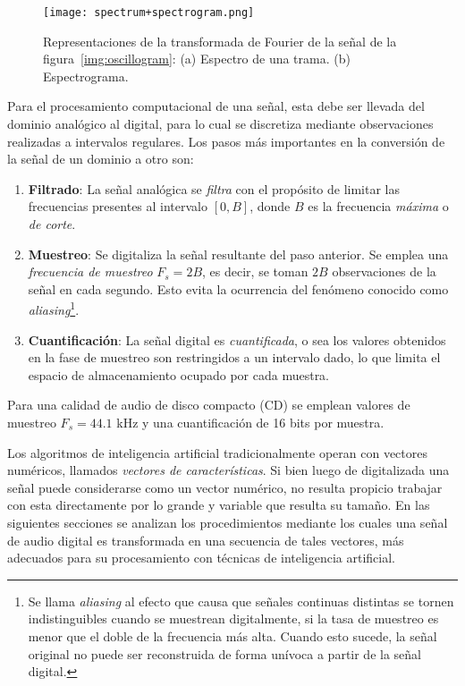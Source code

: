 \begin{figure}[!h]
    \centering
    \texttt{[image: spectrum+spectrogram.png]}
    \caption{Representaciones de la transformada de Fourier de la señal de la figura~\ref{img:oscillogram}: (a) Espectro de una trama. (b) Espectrograma.}
    \label{img:spectrum+spectrogram}
\end{figure}

Para el procesamiento computacional de una señal, esta debe ser llevada del dominio analógico al digital, para lo cual se discretiza mediante observaciones realizadas a intervalos regulares.
Los pasos más importantes en la conversión de la señal de un dominio a otro son:

\begin{enumerate}
    \item \textbf{Filtrado}: La señal analógica se \textit{filtra} con el propósito de limitar las frecuencias presentes al intervalo $[0,B]$, donde $B$ es la frecuencia \textit{máxima} o \textit{de corte}.
    \item \textbf{Muestreo}: Se digitaliza la señal resultante del paso anterior.
    Se emplea una \textit{frecuencia de muestreo} $F_s = 2B$, es decir, se toman $2B$ observaciones de la señal en cada segundo. Esto evita la ocurrencia del fenómeno conocido como \textit{aliasing}\footnote{Se llama \textit{aliasing} al efecto que causa que señales continuas distintas se tornen indistinguibles cuando se muestrean digitalmente, si la tasa de muestreo es menor que el doble de la frecuencia más alta.
    Cuando esto sucede, la señal original no puede ser reconstruida de forma unívoca a partir de la señal digital.}.
    \item \textbf{Cuantificación}: La señal digital es \textit{cuantificada}, o sea los valores obtenidos en la fase de muestreo son restringidos a un intervalo dado, lo que limita el espacio de almacenamiento ocupado por cada muestra.
\end{enumerate}

Para una calidad de audio de disco compacto (CD) se emplean valores de muestreo $F_s = 44.1$ kHz y una cuantificación de 16 bits por muestra.

Los algoritmos de inteligencia artificial tradicionalmente operan con vectores numéricos, llamados \textit{vectores de características}.
Si bien luego de digitalizada una señal puede considerarse como un vector numérico, no resulta propicio trabajar con esta directamente por lo grande y variable que resulta su tamaño.
En las siguientes secciones se analizan los procedimientos mediante los cuales una señal de audio digital es transformada en una secuencia de tales vectores, más adecuados para su procesamiento con técnicas de inteligencia artificial.


